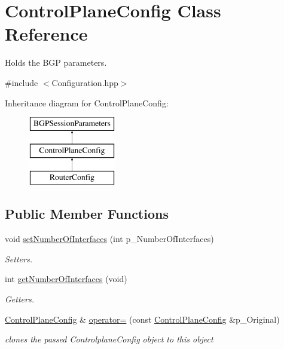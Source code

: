 \hypertarget{classControlPlaneConfig}{\section{Control\-Plane\-Config Class Reference}
\label{classControlPlaneConfig}
}


Holds the B\-G\-P parameters.  




{\ttfamily \#include $<$Configuration.\-hpp$>$}

Inheritance diagram for Control\-Plane\-Config\-:\begin{figure}[H]
\begin{center}
\leavevmode
\includegraphics[height=3.000000cm]{classControlPlaneConfig}
\end{center}
\end{figure}
\subsection*{Public Member Functions}
\begin{DoxyCompactItemize}
\item 
void \hyperlink{classControlPlaneConfig_a75ca255e856818f3593111c6bc06b6c9}{set\-Number\-Of\-Interfaces} (int p\-\_\-\-Number\-Of\-Interfaces)
\begin{DoxyCompactList}\small\item\em Setters. \end{DoxyCompactList}\item 
int \hyperlink{classControlPlaneConfig_aa740ccf69f47b148711f8091aa672f31}{get\-Number\-Of\-Interfaces} (void)
\begin{DoxyCompactList}\small\item\em Getters. \end{DoxyCompactList}\item 
\hyperlink{classControlPlaneConfig}{Control\-Plane\-Config} \& \hyperlink{classControlPlaneConfig_aee06e39d17e552e41d8fc0a88580a022}{operator=} (const \hyperlink{classControlPlaneConfig}{Control\-Plane\-Config} \&p\-\_\-\-Original)
\begin{DoxyCompactList}\small\item\em clones the passed Controlplane\-Config object to this object \end{DoxyCompactList}\end{DoxyCompactItemize}
